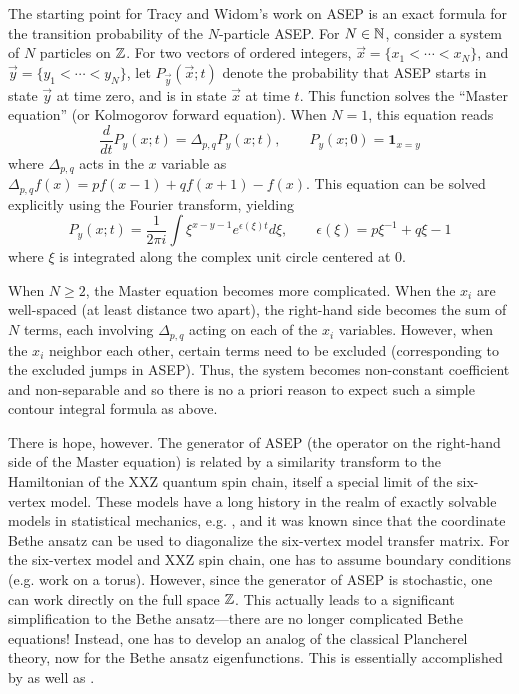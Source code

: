 \documentclass[11pt,letterpaper,reqno]{amsart}
\theoremstyle{definition}
\theoremstyle{remark}
\numberwithin{equation}{section}
\begin{document}
The starting point for Tracy and Widom's work on ASEP is an exact formula for the transition probability of the $N$-particle ASEP. For $N\in {\Bbb N}$, consider a system of $N$ particles on ${\Bbb Z}$. For two vectors of ordered integers, $\vec{x} = \{x_1<\cdots< x_N\}$, and  $\vec{y} = \{ y_1<\cdots< y_N\}$, let $P_{\vec{y}}(\vec{x};t)$ denote the probability that ASEP starts in state $\vec{y}$ at time zero, and is in state $\vec{x}$ at time $t$. This function solves the ``Master equation'' (or Kolmogorov forward equation). When $N=1$, this equation reads
$$
\frac{d}{dt}P_{y}(x;t) = \Delta_{p,q} P_{y}(x;t),\qquad P_{y}(x;0)=\mathbf{1}_{x=y}
$$
where $\Delta_{p,q}$ acts in the $x$ variable as $\Delta_{p,q}f(x) = pf(x-1) + qf(x+1)-f(x)$. This equation can be solved explicitly using the Fourier transform, yielding
$$
P_{y}(x;t) = \frac{1}{2\pi i} \int \xi^{x-y-1} e^{\epsilon(\xi)t} d\xi,\qquad \epsilon(\xi) = p\xi^{-1} +q \xi -1
$$
where $\xi$ is integrated along the complex unit circle centered at $0$.

When $N\geq 2$, the Master equation becomes more complicated. When the $x_i$ are well-spaced (at least distance two apart), the right-hand side becomes the sum of $N$ terms, each involving $\Delta_{p,q}$ acting on each of the $x_i$ variables. However, when the $x_i$ neighbor each other, certain terms need to be excluded (corresponding to the excluded jumps in ASEP). Thus, the system becomes non-constant coefficient and non-separable and so there is no a priori reason to expect such a simple contour integral formula as above.

There is hope, however. The generator of ASEP (the operator on the right-hand side of the Master equation) is related by a similarity transform to the Hamiltonian of the XXZ quantum spin chain, itself a special limit of the six-vertex model. These models have a long history in the realm of exactly solvable models in statistical mechanics, e.g. \cite{Baxter}, and it was known since \cite{Lieb} that the coordinate Bethe ansatz can be used to diagonalize the six-vertex model transfer matrix. For the six-vertex model and XXZ spin chain, one has to assume boundary conditions (e.g. work on a torus). However, since the generator of ASEP is stochastic, one can work directly on the full space ${\Bbb Z}$. This actually leads to a significant simplification to the Bethe ansatz---there are no longer complicated Bethe equations! Instead, one has to develop an analog of the classical Plancherel theory, now for the Bethe ansatz eigenfunctions. This is essentially accomplished by \cite{133} as well as \cite{BCPS}.
\end{document}
